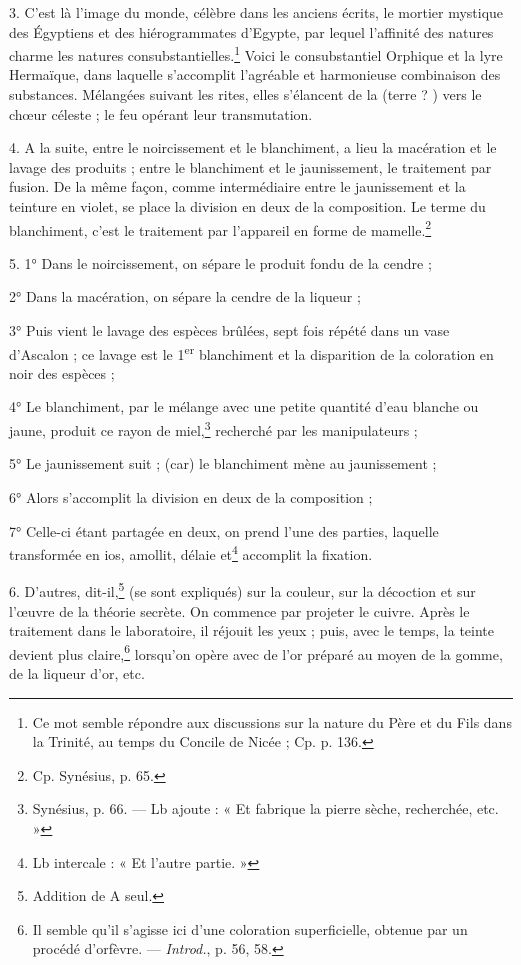 \documentclass[a4paper, 11pt, oneside, polutonikogreek, french]{article}
\begin{document}
3. C'est là l'image du monde, célèbre dans les anciens écrits, le mortier mystique des Égyptiens et des hiérogrammates d'Egypte, par lequel l'affinité des natures charme les natures consubstantielles.\footnote{Ce mot semble répondre aux discussions sur la nature du Père et du Fils dans la Trinité, au temps du Concile de Nicée ; Cp. p. 136.} Voici le consubstantiel Orphique et la lyre Hermaïque, dans laquelle s'accomplit l'agréable et harmonieuse combinaison des substances. Mélangées suivant les rites, elles s'élancent de la (terre ? ) vers le chœur céleste ; le feu opérant leur transmutation.

4. A la suite, entre le noircissement et le blanchiment, a lieu la macération et le lavage des produits ; entre le blanchiment et le jaunissement, le traitement par fusion. De la même façon, comme intermédiaire entre le jaunissement et la teinture en violet, se place la division en deux de la composition. Le terme du blanchiment, c'est le traitement par l'appareil en forme de mamelle.\footnote{Cp. Synésius, p. 65.}

5. 1° Dans le noircissement, on sépare le produit fondu de la cendre ;

2° Dans la macération, on sépare la cendre de la liqueur ;

3° Puis vient le lavage des espèces brûlées, sept fois répété dans un vase d'Ascalon ; ce lavage est le 1\textsuperscript{er} blanchiment et la disparition de la coloration en noir des espèces ;

4° Le blanchiment, par le mélange avec une petite quantité d'eau blanche ou jaune, produit ce rayon de miel,\footnote{Synésius, p. 66. --- Lb ajoute : « Et fabrique la pierre sèche, recherchée, etc. »} recherché par les manipulateurs ;

5° Le jaunissement suit ; (car) le blanchiment mène au jaunissement ;

6° Alors s'accomplit la division en deux de la composition ;

7° Celle-ci étant partagée en deux, on prend l'une des parties, laquelle transformée en ios, amollit, délaie et\footnote{Lb intercale : « Et l'autre partie. »} accomplit la fixation.

6. D'autres, dit-il,\footnote{Addition de A seul.} (se sont expliqués) sur la couleur, sur la décoction et sur l'œuvre de la théorie secrète. On commence par projeter le cuivre. Après le traitement dans le laboratoire, il réjouit les yeux ; puis, avec le temps, la teinte devient plus claire,\footnote{Il semble qu'il s'agisse ici d'une coloration superficielle, obtenue par un procédé d'orfèvre. --- \emph{Introd.}, p. 56, 58.} lorsqu'on opère avec de l'or préparé au moyen de la gomme, de la liqueur d'or, etc.
\end{document}
